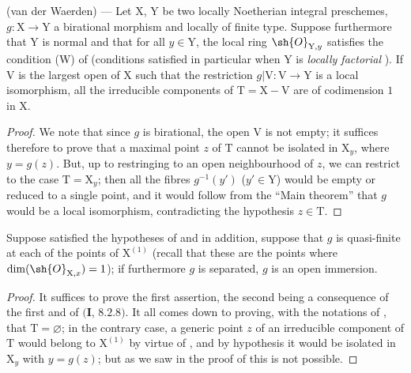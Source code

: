 \begin{theorem}[21.12.12]
\label{IV.21.12.12}
\textup{(van der Waerden)} ---
Let $\mathrm{X}$, $\mathrm{Y}$ be two locally Noetherian integral preschemes, $g:\mathrm{X}\to\mathrm{Y}$ a birational morphism and locally of finite type.
Suppose furthermore that $\mathrm{Y}$ is normal and that for all $y\in\mathrm{Y}$, the local ring $\sh{O}_{\mathrm{Y},y}$ satisfies the condition \textup{(W)} of  (conditions satisfied in particular when $\mathrm{Y}$ is \emph{locally factorial} ).
If $\mathrm{V}$ is the largest open of $\mathrm{X}$ such that the restriction $g|\mathrm{V}:\mathrm{V}\to\mathrm{Y}$ is a local isomorphism, all the irreducible components of $\mathrm{T}=\mathrm{X}-\mathrm{V}$ are of codimension $1$ in $\mathrm{X}$.
\end{theorem}

\begin{proof}
We note that since $g$ is birational, the open $\mathrm{V}$ is not empty; it suffices therefore to prove that a maximal point $z$ of $\mathrm{T}$ cannot be isolated in $\mathrm{X}_y$, where $y=g(z)$.
But, up to restringing to an open neighbourhood of $z$, we can restrict to the case $\mathrm{T}=\mathrm{X}_y$; then all the fibres $g^{-1}(y')$ ($y'\in\mathrm{Y}$) would be empty or reduced to a single point, and it would follow from the ``Main theorem''  that $g$ would be a local isomorphism, contradicting the hypothesis $z\in\mathrm{T}$.
\end{proof}

\begin{corollary}[21.12.13]
\label{IV.21.12.13}
Suppose satisfied the hypotheses of  and in addition, suppose that $g$ is quasi-finite at each of the points of $\mathrm{X}^{(1)}$ (recall that these are the points where $\dim(\sh{O}_{\mathrm{X},x})=1$); if furthermore $g$ is separated, $g$ is an open immersion.
\end{corollary}

\begin{proof}
It suffices to prove the first assertion, the second being a consequence of the first and of $(\mathbf{I}$, $8.2.8)$.
It all comes down to proving, with the notations of , that $\mathrm{T}=\varnothing$; in the contrary case, a generic point $z$ of an irreducible component of $\mathrm{T}$ would belong to $\mathrm{X}^{(1)}$ by virtue of , and by hypothesis it would be isolated in $\mathrm{X}_y$ with $y=g(z)$; but as we saw in the proof of  this is not possible.
\end{proof}

